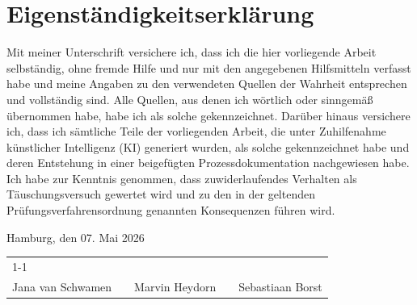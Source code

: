 \clearpage
\section{Eigenständigkeitserklärung}
Mit meiner Unterschrift versichere ich, dass ich die hier vorliegende Arbeit selbständig, ohne 
fremde Hilfe und nur mit den angegebenen Hilfsmitteln verfasst habe und meine Angaben zu 
den verwendeten Quellen der Wahrheit entsprechen und vollständig sind. Alle Quellen, aus 
denen ich wörtlich oder sinngemäß übernommen habe, habe ich als solche gekennzeichnet.   
Darüber hinaus versichere ich, dass ich sämtliche Teile der vorliegenden Arbeit, die unter 
Zuhilfenahme künstlicher Intelligenz (KI) generiert wurden, als solche gekennzeichnet habe und 
deren Entstehung in einer beigefügten Prozessdokumentation nachgewiesen habe.  
Ich habe zur Kenntnis genommen, dass zuwiderlaufendes Verhalten als Täuschungsversuch 
gewertet wird und zu den in der geltenden Prüfungsverfahrensordnung genannten 
Konsequenzen führen wird. 


Hamburg, den 07. Mai 2026

\vspace{2cm}

\noindent
\begin{tabular}{p{4.3cm} p{0.55cm} p{4.3cm} p{0.55cm} p{4.3cm}}
\cline{1-1} \cline{3-3} \cline{5-5} \\[-0.5em]
Jana van Schwamen & & Marvin Heydorn & & Sebastiaan Borst \\
\end{tabular}